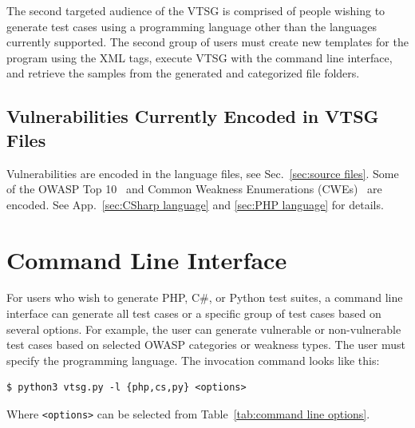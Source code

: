 \documentclass[12pt]{article}
\newcommand{\CSharp}{C{\fontseries{b}\selectfont\#}}
\begin{document}
The second targeted audience of the VTSG is comprised of people wishing to generate
test cases using a programming language other than the languages currently
supported.  The second group of users must create new templates for the program
using the XML tags, execute VTSG with the command line interface,
and retrieve the samples from the generated and categorized file folders.

\subsection{Vulnerabilities Currently Encoded in VTSG Files}

Vulnerabilities are encoded in the language files, see Sec.~\ref{sec:source files}.
Some of the OWASP Top 10~\cite{OWASPTop10-2017} and
Common Weakness Enumerations (CWEs)~\cite{CWE} are encoded.
See App.~\ref{sec:CSharp language} and \ref{sec:PHP language} for details.


\section{Command Line Interface}
\label{sec:command line interface}

For users who wish to generate PHP, \CSharp, or Python test suites, a command line
interface
can generate all test cases or a specific group of test cases based on several
options.  For example, the user can generate vulnerable or non-vulnerable test cases
based on selected OWASP categories or weakness types.  The user must specify the
programming language.  The invocation command looks like this:
\begin{verbatim}
$ python3 vtsg.py -l {php,cs,py} <options>
\end{verbatim}

\newcommand{\texlangle}{$\langle$}
\newcommand{\texrangle}{$\rangle$}
Where \verb|<options>| can be selected from
Table~\ref{tab:command line options}.
\end{document}
